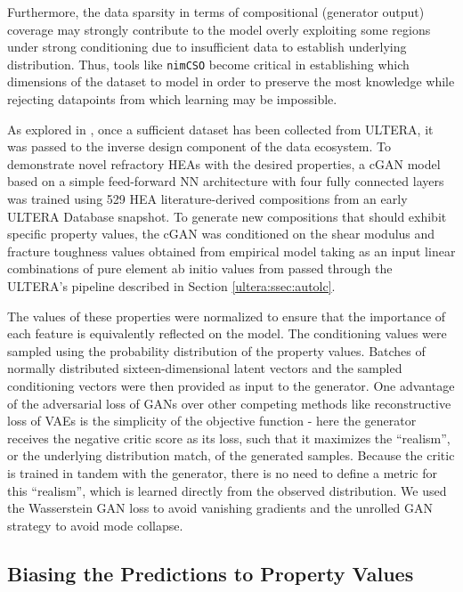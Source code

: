 Furthermore, the data sparsity in terms of compositional (generator output) coverage may strongly contribute to the model overly exploiting some regions under strong conditioning due to insufficient data to establish underlying distribution. Thus, tools like \texttt{nimCSO} become critical in establishing which dimensions of the dataset to model in order to preserve the most knowledge while rejecting datapoints from which learning may be impossible.

As explored in \citet{Debnath2021GenerativeAlloys}, once a sufficient dataset has been collected from ULTERA, it was passed to the inverse design component of the data ecosystem. To demonstrate novel refractory HEAs with the desired properties, a cGAN model based on a simple feed-forward NN architecture with four fully connected layers was trained using 529 HEA literature-derived compositions from an early ULTERA Database snapshot. To generate new compositions that should exhibit specific property values, the cGAN was conditioned on the shear modulus and fracture toughness values obtained from empirical model taking as an input linear combinations of pure element ab initio values from \citet{Chong2021CorrelationAlloys} passed through the ULTERA's pipeline described in Section \ref{ultera:ssec:autolc}.

The values of these properties were normalized to ensure that the importance of each feature is equivalently reflected on the model. The conditioning values were sampled using the probability distribution of the property values. Batches of normally distributed sixteen-dimensional latent vectors and the sampled conditioning vectors were then provided as input to the generator. One advantage of the adversarial loss of GANs over other competing methods like reconstructive loss of VAEs is the simplicity of the objective function - here the generator receives the negative critic score as its loss, such that it maximizes the “realism”, or the underlying distribution match, of the generated samples. Because the critic is trained in tandem with the generator, there is no need to define a metric for this “realism”, which is learned directly from the observed distribution. We used the Wasserstein GAN \cite{Arjovsky2017WassersteinNetworks} loss to avoid vanishing gradients and the unrolled GAN \cite{Metz2016UnrolledNetworks} strategy to avoid mode collapse.

\subsection{Biasing the Predictions to Property Values} \label{inverse:ssec:propbias}

